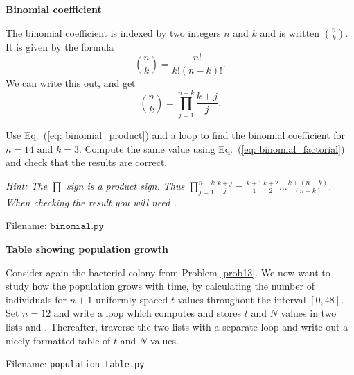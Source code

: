 \begin{Problem}{\textbf{Binomial coefficient}}\label{prob26}

\noindent The binomial coefficient is indexed by two integers $n$ and $k$ and is written
$\binom{n}{k}$. It is given by the formula
\begin{equation}\label{eq: binomial_factorial}
\binom{n}{k} = \frac{n!}{k!(n-k)!}.
\end{equation}
We can write this out, and get
\begin{equation}\label{eq: binomial_product}
\binom{n}{k} = \prod_{j = 1}^{n - k}\frac{k + j}{j}.
\end{equation}

Use Eq.~(\ref{eq: binomial_product}) and a  loop to find the binomial coefficient
for $n = 14$ and $k = 3$. Compute the same value using Eq.~(\ref{eq: binomial_factorial})
and check that the results are correct.

\emph{Hint: The $\prod$ sign is a product sign. Thus
$\prod_{j = 1}^{n - k}\frac{k + j}{j} = \frac{k + 1}{1}\frac{k + 2}{2}
\dots\frac{k + (n - k)}{(n - k)}$. When checking the result you will need
.}

Filename: $\texttt{binomial.py}$
\end{Problem}



\begin{Problem}{\textbf{Table showing population growth}} \label{population_table}

\noindent Consider again the bacterial colony from Problem \ref{prob13}. We now want to
study how the population grows with time, by calculating the number
of individuals for $n + 1$ uniformly spaced $t$ values throughout the interval
$[0, 48]$. Set $n = 12$ and write a  loop which computes and stores
$t$ and $N$ values in two lists  and . Thereafter,
traverse the two lists with a separate  loop and
write out a nicely formatted table of $t$ and $N$
values.

Filename: \texttt{population\_table.py}
\end{Problem}


